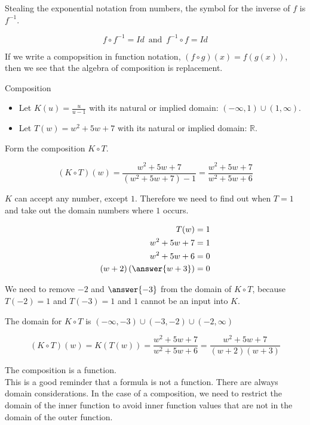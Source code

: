 \documentclass{ximera}
\begin{document}
Stealing the exponential notation from numbers, the symbol for the inverse of $f$ is $f^{-1}$.

\[   f \circ f^{-1} = Id    \, \text{ and } \, f^{-1} \circ f = Id       \]




If we write a compopsition in function notation, $(f \circ g)(x) = f(g(x))$, then we see that the algebra of composition is replacement.





\begin{example} Composition


\begin{itemize}
\item Let $K(u) = \frac{u}{u-1}$ with its natural or implied domain: $(-\infty, 1) \cup (1, \infty)$. \\

\item Let $T(w) = w^2 + 5w + 7$ with its natural or implied domain: \textbf{$\mathbb{R}$}.
\end{itemize}


Form the composition $K \circ T$.

\[        (K \circ T)(w) =     \frac{w^2 + 5w + 7}{(w^2 + 5w + 7)-1}   =    \frac{w^2 + 5w + 7}{w^2 + 5w + 6}  \]


$K$ can accept any number, except $1$.  Therefore we need to find out when $T = 1$ and take out the domain numbers where $1$ occurs.



\begin{align*}
T(w) & = 1   \\
w^2 + 5w + 7 & = 1 \\
w^2 + 5w + 6 & = 0   \\
(w+2)\left( \answer{w+3} \right) & = 0
\end{align*}


We need to remove $-2$ and $\answer{-3}$ from the domain of $K \circ T$, because $T(-2)=1$ and $T(-3)=1$ and $1$ cannot be an input into $K$.


The domain for $K \circ T$ is $(-\infty, -3) \cup (-3, -2) \cup (-2, \infty)$




\[        (K \circ T)(w)  =  K(T(w))  = \frac{w^2 + 5w + 7}{w^2 + 5w + 6}  =    \frac{w^2 + 5w + 7}{(w+2)(w+3)} \]










The composition is a function. \\


This is a good reminder that a formula is not a function. There are always domain considerations.  In the case of a composition, we need to restrict the domain of the inner function to avoid inner function values that are not in the domain of the outer function.










\end{example}
\end{document}

